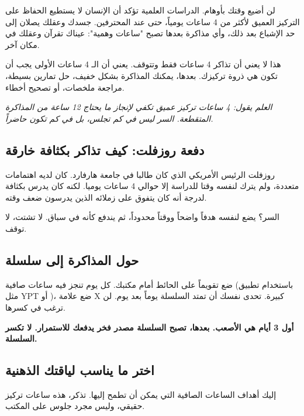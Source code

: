 \documentclass[12pt,a4paper]{book}
\newcommand{\quoteAr}[1]{%
	\begin{myquote}
		\itshape #1
	\end{myquote}
}
\newcommand{\importantAr}[1]{%
	\begin{important}
		\bfseries #1
	\end{important}
}
\begin{document}
	لن أضيع وقتك بأوهام. الدراسات العلمية تؤكد أن الإنسان لا يستطيع الحفاظ على التركيز العميق لأكثر من 4 ساعات يومياً، حتى عند المحترفين. جسدك وعقلك يصلان إلى حد الإشباع بعد ذلك، وأي مذاكرة بعدها تصبح "ساعات وهمية": عيناك تقرآن وعقلك في مكان آخر.
	
	هذا لا يعني أن تذاكر 4 ساعات فقط وتتوقف. يعني أن الـ 4 ساعات الأولى يجب أن تكون هي ذروة تركيزك. بعدها، يمكنك المذاكرة بشكل خفيف، حل تمارين بسيطة، مراجعة ملخصات، أو تصحيح أخطاء.
	
	\quoteAr{العلم يقول: 4 ساعات تركيز عميق تكفي لإنجاز ما يحتاج 12 ساعة من المذاكرة المتقطعة. السر ليس في كم تجلس، بل في كم تكون حاضراً.}
	
	\subsection{دفعة روزفلت: كيف تذاكر بكثافة خارقة}
	
	روزفلت الرئيس الأمريكي الذي كان طالبا في جامعة هارفارد. كان لديه اهتمامات متعددة، ولم يترك لنفسه وقتا للدراسة إلا حوالي 4 ساعات يوميا. لكنه كان يدرس بكثافة لدرجة أنه كان يتفوق على زملائه الذين يدرسون ضعف وقته.
	
	السر؟ يضع لنفسه هدفاً واضحاً ووقتاً محدوداً، ثم يندفع كأنه في سباق. لا تشتت، لا توقف.
	
	\subsection{حول المذاكرة إلى سلسلة}
	
	ضع تقويماً على الحائط أمام مكتبك. كل يوم تنجز فيه ساعات صافية (باستخدام تطبيق مثل YPT أو  )، ضع علامة X كبيرة. تحدى نفسك أن تمتد السلسلة يوماً بعد يوم. لن ترغب في كسرها.
	
	\importantAr{أول 3 أيام هي الأصعب. بعدها، تصبح السلسلة مصدر فخر يدفعك للاستمرار. لا تكسر السلسلة.}
	
	\subsection{اختر ما يناسب لياقتك الذهنية}
	
	إليك أهداف الساعات الصافية التي يمكن أن تطمح إليها. تذكر، هذه ساعات تركيز حقيقي، وليس مجرد جلوس على المكتب.
	
\end{document}
